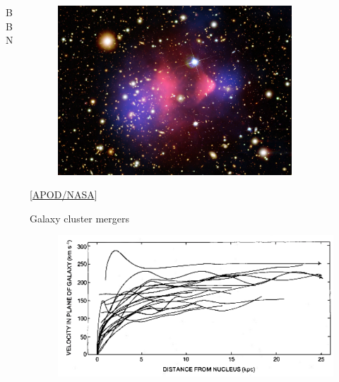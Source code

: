 \documentclass[10pt,aspectratio=169]{beamer}
\begin{document}
\begin{frame}
\begin{columns}[t]
\begin{column}{0.3\textwidth}
\begin{center}
        BBN
      \end{center}
    \end{column}
    \begin{column}{0.3\textwidth}
      \vspace*{-20pt}
      \begin{figure}
        \centering
        \includegraphics[width=0.85\textwidth]{bulletcluster}
      \end{figure}
      \vspace*{-25pt}
      \begin{center}
        {\tiny [\href{https://apod.nasa.gov/apod/ap060824.html}{APOD/NASA}]}
      \end{center}
      \vspace*{-20pt}
      \begin{center}
        Galaxy cluster mergers
      \end{center}
      \vspace*{-10pt}
      \begin{figure}
        \centering
        \includegraphics[width=\textwidth]{rotation_curves}
      \end{figure}

\end{column}
\end{columns}
\end{frame}
\end{document}
